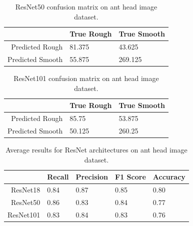 \documentclass[12pt]{article}
\begin{document}
\vspace{0.5in}

\begin{table}[h]
    \centering
    \caption{ResNet50 confusion matrix on ant head image dataset.}
    \begin{tabular}{r|ll}
                         & True Rough & True Smooth \\
        \hline
        Predicted Rough  & 81.375     & 43.625      \\
        Predicted Smooth & 55.875     & 269.125     \\
    \end{tabular}
    \label{tab:resnet50_confusion_matrix}
\end{table}

\vspace{0.5in}

\begin{table}[h]
    \centering
    \caption{ResNet101 confusion matrix on ant head image dataset.}
    \begin{tabular}{r|ll}
                         & True Rough & True Smooth \\
        \hline
        Predicted Rough  & 85.75      & 53.875      \\
        Predicted Smooth & 50.125     & 260.25      \\
    \end{tabular}
    \label{tab:resnet101_confusion_matrix}
\end{table}

\vspace{0.5in}

\begin{table}[h]
    \centering
    \caption{Average results for ResNet architectures on ant head image dataset.}
    \begin{tabular}{r|llll}
                  & Recall & Precision & F1 Score & Accuracy \\
        \hline
        ResNet18  & 0.84   & 0.87      & 0.85     & 0.80     \\
        ResNet50  & 0.86   & 0.83      & 0.84     & 0.77     \\
        ResNet101 & 0.83   & 0.84      & 0.83     & 0.76     \\
    \end{tabular}
    \label{tab:resnet_results}
\end{table}
\end{document}
